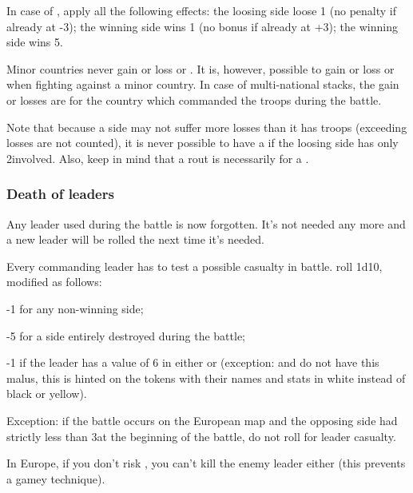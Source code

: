 \aparag In case of , apply all the following effects:
\bparag the loosing side loose 1 \STAB (no penalty if already at -3);
\bparag the winning side wins 1 \STAB (no bonus if already at +3);
\bparag the winning side wins 5\VPs.

Minor countries never gain or loss \STAB or \VPs. It is, however, possible to
gain or loss \STAB or \VPs when fighting against a minor country. In case of
multi-national stacks, the gain or losses are for the country which commanded
the troops during the battle.

\begin{designnote}
  Note that because a side may not suffer more losses than it has troops
  (exceeding losses are not counted), it is never possible to have a
   if the loosing side has only 2\LD involved. Also, keep
  in mind that a rout is necessarily for a .
\end{designnote}

\subsubsection{Death of leaders}
Any  leader used during the battle is now forgotten. It's
not needed any more and a new  leader will be rolled the
next time it's needed.

Every commanding leader has to test a possible casualty in battle. roll 1d10,
modified as follows:
\begin{modlist}
\item[-1] for any non-winning side;
\item[-5] for a side entirely destroyed during the battle;
\item[-1] if the leader has a value of 6 in either \Fire or \Shock (exception:
   and  do not have this malus, this
  is hinted on the tokens with their names and stats in white instead of black
  or yellow).
\end{modlist}

Exception: if the battle occurs on the European map and the opposing side had
strictly less than 3\LD at the beginning of the battle, do not roll for leader
casualty.

\begin{designnote}
  In Europe, if you don't risk , you can't kill the enemy
  leader either (this prevents a gamey technique).
\end{designnote}

